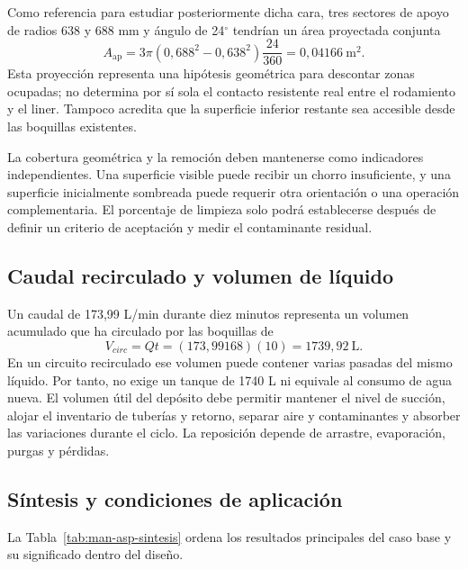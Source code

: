 Como referencia para estudiar posteriormente dicha cara, tres sectores
de apoyo de radios 638 y 688 mm y ángulo de 24$^\circ$ tendrían un área
proyectada conjunta
\begin{equation}
 A_{\mathrm{ap}}=3\pi(0{,}688^2-0{,}638^2)\frac{24}{360}
 =0{,}04166\ \mathrm{m^2}.
\end{equation}
Esta proyección representa una hipótesis geométrica para descontar zonas
ocupadas; no determina por sí sola el contacto resistente real entre
el rodamiento y el liner. Tampoco acredita que la superficie inferior
restante sea accesible desde las boquillas existentes.

La cobertura geométrica y la remoción deben mantenerse como indicadores
independientes. Una superficie visible puede recibir un chorro
insuficiente, y una superficie inicialmente sombreada puede requerir
otra orientación o una operación complementaria. El porcentaje de
limpieza solo podrá establecerse después de definir un criterio de
aceptación y medir el contaminante residual.

\subsection{Caudal recirculado y volumen de líquido}

Un caudal de 173,99 L/min durante diez minutos representa un volumen
acumulado que ha circulado por las boquillas de
\begin{equation}
 V_{circ}=Qt=(173{,}99168)(10)=1739{,}92\ \mathrm{L}.
\end{equation}
En un circuito recirculado ese volumen puede contener varias pasadas
del mismo líquido. Por tanto, no exige un tanque de 1740 L ni equivale
al consumo de agua nueva. El volumen útil del depósito debe permitir
mantener el nivel de succión, alojar el inventario de tuberías y retorno,
separar aire y contaminantes y absorber las variaciones durante el ciclo.
La reposición depende de arrastre, evaporación, purgas y pérdidas.

\subsection{Síntesis y condiciones de aplicación}
\label{sec:man-asp-conclusion}

La Tabla~\ref{tab:man-asp-sintesis} ordena los resultados principales del
caso base y su significado dentro del diseño.

